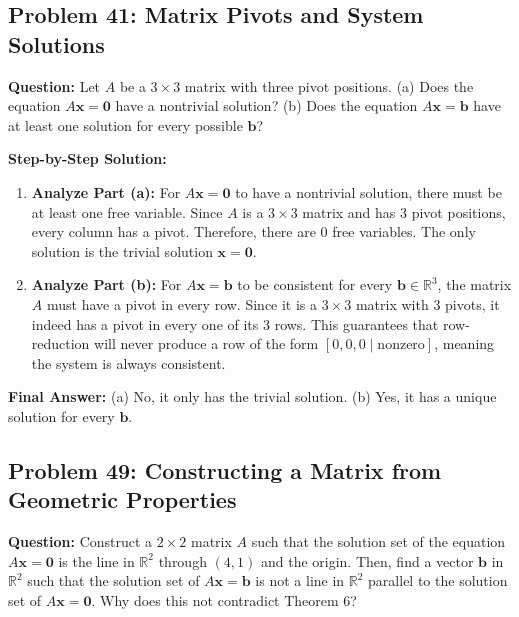 \documentclass[11pt]{article}
\begin{document}
\subsection*{Problem 41: Matrix Pivots and System Solutions}
\textbf{Question:} Let $A$ be a $3 \times 3$ matrix with three pivot positions.
(a) Does the equation $A\mathbf{x} = \mathbf{0}$ have a nontrivial solution?
(b) Does the equation $A\mathbf{x} = \mathbf{b}$ have at least one solution for every possible $\mathbf{b}$?

\textbf{Step-by-Step Solution:}
\begin{enumerate}
    \item \textbf{Analyze Part (a):} For $A\mathbf{x} = \mathbf{0}$ to have a nontrivial solution, there must be at least one free variable. Since $A$ is a $3 \times 3$ matrix and has $3$ pivot positions, every column has a pivot. Therefore, there are $0$ free variables. The only solution is the trivial solution $\mathbf{x} = \mathbf{0}$.
    \item \textbf{Analyze Part (b):} For $A\mathbf{x} = \mathbf{b}$ to be consistent for every $\mathbf{b} \in \mathbb{R}^3$, the matrix $A$ must have a pivot in every row. Since it is a $3 \times 3$ matrix with $3$ pivots, it indeed has a pivot in every one of its $3$ rows. This guarantees that row-reduction will never produce a row of the form $[0, 0, 0 \mid \text{nonzero}]$, meaning the system is always consistent.
\end{enumerate}
\textbf{Final Answer:} (a) No, it only has the trivial solution. (b) Yes, it has a unique solution for every $\mathbf{b}$.

\subsection*{Problem 49: Constructing a Matrix from Geometric Properties}
\textbf{Question:} Construct a $2 \times 2$ matrix $A$ such that the solution set of the equation $A\mathbf{x} = \mathbf{0}$ is the line in $\mathbb{R}^2$ through $(4, 1)$ and the origin. Then, find a vector $\mathbf{b}$ in $\mathbb{R}^2$ such that the solution set of $A\mathbf{x} = \mathbf{b}$ is not a line in $\mathbb{R}^2$ parallel to the solution set of $A\mathbf{x} = \mathbf{0}$. Why does this not contradict Theorem 6?
\end{document}
